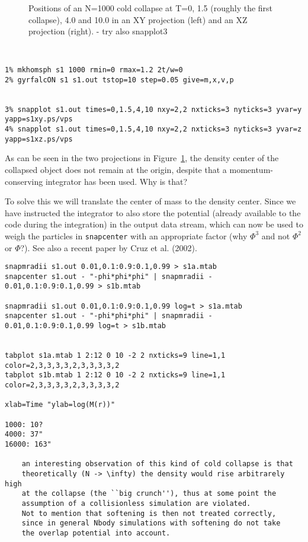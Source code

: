 \begin{itemize}
\begin{itemize}
\begin{figure}[htb]
\caption[Cold Collapse of an N=1000 system]
{Positions of an N=1000 cold collapse at T=0, 1.5 (roughly
the first collapse), 4.0 and 10.0 in an XY projection (left) 
and an XZ projection (right). - try also snapplot3 }
\label{f:s1xy}
\end{figure}

\footnotesize\begin{verbatim}


1% mkhomsph s1 1000 rmin=0 rmax=1.2 2t/w=0
2% gyrfalcON s1 s1.out tstop=10 step=0.05 give=m,x,v,p


3% snapplot s1.out times=0,1.5,4,10 nxy=2,2 nxticks=3 nyticks=3 yvar=y yapp=s1xy.ps/vps
4% snapplot s1.out times=0,1.5,4,10 nxy=2,2 nxticks=3 nyticks=3 yvar=z yapp=s1xz.ps/vps

\end{verbatim}\normalsize

As can be seen in the two projections in Figure~\ref{f:s1xy}, the density center
of the collapsed object does not remain at the origin, despite that a 
momentum-conserving integrator has been used. Why is that?

To solve this we will translate the center of mass to the density center. Since
we have instructed the integrator to also store the potential (already
available to the code during the integration) in the output data stream, which
can now be used to weigh the particles in {\tt snapcenter} with an appropriate
factor (why $\Phi^3$ and not $\Phi^2$ or $\Phi$?). See also  a recent
paper by Cruz et al. (2002).

\footnotesize\begin{verbatim}
snapmradii s1.out 0.01,0.1:0.9:0.1,0.99 > s1a.mtab
snapcenter s1.out - "-phi*phi*phi" | snapmradii - 0.01,0.1:0.9:0.1,0.99 > s1b.mtab

snapmradii s1.out 0.01,0.1:0.9:0.1,0.99 log=t > s1a.mtab
snapcenter s1.out - "-phi*phi*phi" | snapmradii - 0.01,0.1:0.9:0.1,0.99 log=t > s1b.mtab


tabplot s1a.mtab 1 2:12 0 10 -2 2 nxticks=9 line=1,1 color=2,3,3,3,3,2,3,3,3,3,2
tabplot s1b.mtab 1 2:12 0 10 -2 2 nxticks=9 line=1,1 color=2,3,3,3,3,2,3,3,3,3,2

xlab=Time "ylab=log(M(r))"

1000: 10?
4000: 37"
16000: 163"

    an interesting observation of this kind of cold collapse is that
    theoretically (N -> \infty) the density would rise arbitrarely high
    at the collapse (the ``big crunch''), thus at some point the
    assumption of a collisionless simulation are violated.
    Not to mention that softening is then not treated correctly,
    since in general Nbody simulations with softening do not take
    the overlap potential into account.


\end{verbatim}
\end{itemize}
\end{itemize}
